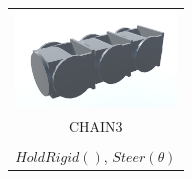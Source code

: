 \documentclass{standalone}
\newcommand{\picHeight}{1in}
\begin{document}
        \begin{tabular}{| c |}
            \hline
		\includegraphics[height=\picHeight]{unity/threeModules.png} %
             \\ 
            CHAIN3
            \\ \hline
            
            \pbox{20cm}{\(Drive(v,t)\), \(SteeringPose()\), \(LegStep()\), \\ \(HoldRigid()\), \(Steer(\theta)\) }
            \\ \hline
        \end{tabular}
\end{document}
